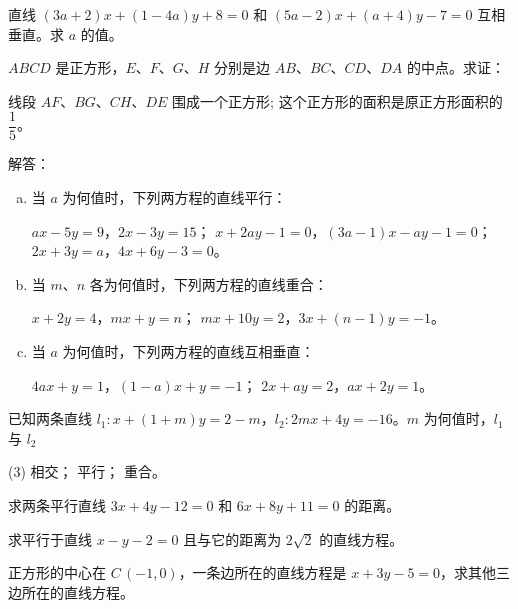 \begin{question}
  \item 直线 $(3a+2)x+(1-4a)y+8=0$ 和 $(5a-2)x+(a+4)y-7=0$ 互相垂直。求 $a$ 的值。
  \item $ABCD$ 是正方形，$E$、$F$、$G$、$H$ 分别是边 $AB$、$BC$、$CD$、$DA$ 的中点。求证：
  \begin{tasks}
    \task 线段 $AF$、$BG$、$CH$、$DE$ 围成一个正方形;
    \task 这个正方形的面积是原正方形面积的 $\dfrac{1}{5}$。
  \end{tasks}
  \item 解答：
  \begin{enumerate}[a),itemindent=1.5em]
    \item 当 $a$ 为何值时，下列两方程的直线平行：
    \begin{tasks}[label=\roman*)]
      \task $ax-5y=9$，$2x-3y=15$；
      \task $x+2ay-1=0$，$(3a-1)x-ay-1=0$；
      \task $2x+3y=a$，$4x+6y-3=0$。
    \end{tasks}
    \item 当 $m$、$n$ 各为何值时，下列两方程的直线重合：
    \begin{tasks}[label=\roman*)]
      \task $x+2y=4$，$mx+y=n$；
      \task $mx+10y=2$，$3x+(n-1)y=-1$。
    \end{tasks}
    \item 当 $a$ 为何值时，下列两方程的直线互相垂直：
    \begin{tasks}[label=\roman*)]
      \task $4ax+y=1$，$(1-a)x+y=-1$；
      \task $2x+ay=2$，$ax+2y=1$。
    \end{tasks}
  \end{enumerate}
  \item 已知两条直线 $l_1:x+(1+m)y=2-m$，$l_2:2mx+4y=-16$。$m$ 为何值时，$l_1$ 与 $l_2$
  \begin{tasks}(3)
    \task 相交；
    \task 平行；
    \task 重合。
  \end{tasks}
  \item 求两条平行直线 $3x+4y-12=0$ 和 $6x+8y+11=0$ 的距离。
  \item 求平行于直线 $x-y-2=0$ 且与它的距离为 $2\sqrt{2}$ 的直线方程。
  \item 正方形的中心在 $C\,(-1,0)$，一条边所在的直线方程是 $x+3y-5=0$，求其他三边所在的直线方程。
\end{question}
